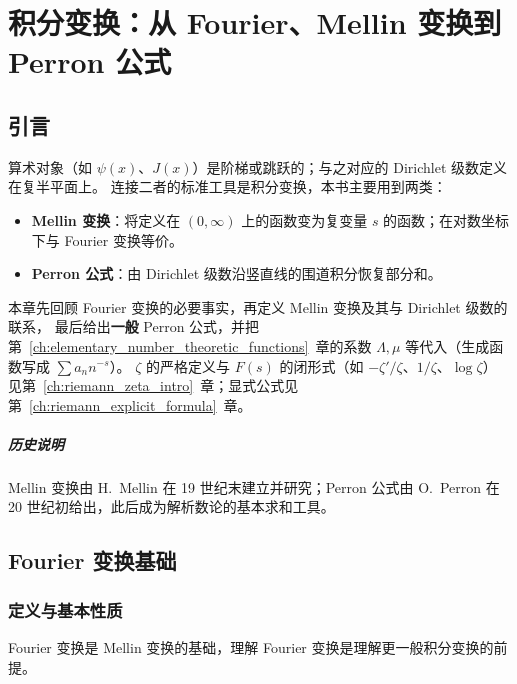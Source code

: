 \chapter{积分变换：从 Fourier、Mellin 变换到 Perron 公式}\label{ch:integral_transforms}
\section{引言}\label{sec:intro_integral_transforms}

算术对象（如 $\psi(x)$、$J(x)$）是阶梯或跳跃的；与之对应的 Dirichlet 级数定义在复半平面上。
连接二者的标准工具是积分变换，本书主要用到两类：

\begin{itemize}
  \item \textbf{Mellin 变换}：将定义在 $(0,\infty)$ 上的函数变为复变量 $s$ 的函数；在对数坐标下与 Fourier 变换等价。
  \item \textbf{Perron 公式}：由 Dirichlet 级数沿竖直线的围道积分恢复部分和。
\end{itemize}

本章先回顾 Fourier 变换的必要事实，再定义 Mellin 变换及其与 Dirichlet 级数的联系，
最后给出\textbf{一般} Perron 公式，并把第~\ref{ch:elementary_number_theoretic_functions}~章的系数
$\Lambda,\mu$ 等代入（生成函数写成 $\sum a_n n^{-s}$）。
$\zeta$ 的严格定义与 $F(s)$ 的闭形式（如 $-\zeta'/\zeta$、$1/\zeta$、$\log\zeta$）
见第~\ref{ch:riemann_zeta_intro}~章；显式公式见第~\ref{ch:riemann_explicit_formula}~章。

\paragraph{历史说明}
Mellin 变换由 H.~Mellin 在 19 世纪末建立并研究；Perron 公式由 O.~Perron 在 20 世纪初给出，此后成为解析数论的基本求和工具。


\section{Fourier 变换基础}

\subsection{定义与基本性质}

Fourier 变换是 Mellin 变换的基础，理解 Fourier 变换是理解更一般积分变换的前提。

